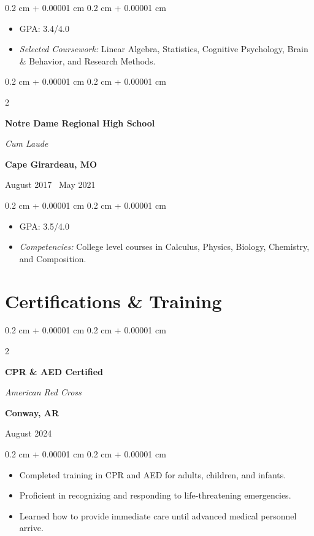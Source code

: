 \documentclass[10pt, letterpaper]{article}
\newenvironment{highlights}{
    \begin{itemize}[
        topsep=0.10 cm,
        parsep=0.10 cm,
        partopsep=0pt,
        itemsep=0pt,
        leftmargin=0.4 cm + 10pt
    ]
}{
    \end{itemize}
} %
\newenvironment{onecolentry}{
    \begin{adjustwidth}{
        0.2 cm + 0.00001 cm
    }{
        0.2 cm + 0.00001 cm
    }
}{
    \end{adjustwidth}
} %
\newenvironment{twocolentry}[2][]{
    \onecolentry
    \def\secondColumn{#2}
    \setcolumnwidth{\fill, 4.5 cm}
    \begin{paracol}{2}
}{
    \switchcolumn \raggedleft \secondColumn
    \end{paracol}
    \endonecolentry
} %
\begin{document}
\vspace{0.10 cm}

\begin{onecolentry}
    \begin{highlights}
        \item GPA: 3.4/4.0
        \item \textit{Selected Coursework:} Linear Algebra, Statistics, Cognitive Psychology, Brain \& Behavior, and Research Methods.
    \end{highlights}
\end{onecolentry}


\begin{twocolentry}{
        \textbf{Cape Girardeau, MO}

        August 2017 \textendash\ May 2021}
    \textbf{Notre Dame Regional High School}

    \textit{Cum Laude}
\end{twocolentry}

\vspace{0.10 cm}
\begin{onecolentry}
    \begin{highlights}
        \item GPA: 3.5/4.0
        \item \textit{Competencies:} College level courses in Calculus, Physics, Biology, Chemistry, and Composition.
    \end{highlights}
\end{onecolentry}




\section{Certifications \& Training}


\begin{twocolentry}{
        \textbf{Conway, AR}

        August 2024}
    \textbf{CPR \& AED Certified}

    \textit{American Red Cross}
\end{twocolentry}

\vspace{0.10 cm}
\begin{onecolentry}
    \begin{highlights}
        \item Completed training in CPR and AED for adults, children, and infants.
        \item Proficient in recognizing and responding to life-threatening emergencies.
        \item Learned how to provide immediate care until advanced medical personnel arrive.
    \end{highlights}
\end{onecolentry}
\end{document}

